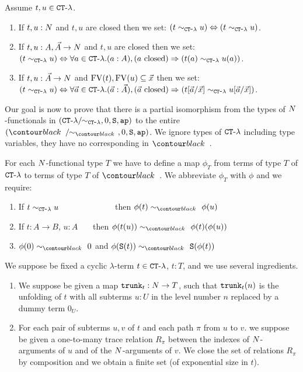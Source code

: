 \begin{definition}
Assume $t,u \in { {\tt CT} \mbox{-} \lambda}$.
\begin{enumerate}
\item
If $t,u:{N}$ and $t,u$ are closed then we set: 
$(t \sim_{{ {\tt CT} \mbox{-} \lambda}} u) \Leftrightarrow  (t \sim_{{ {\tt CT} \mbox{-} \lambda}} u)$.
\item
If $t,u:A,\vec{A}\rightarrow{N}$ and $t,u$ are closed then we set: 
$(t \sim_{{ {\tt CT} \mbox{-} \lambda}} u) \Leftrightarrow  
\forall a \in { {\tt CT} \mbox{-} \lambda}. (a:A), (\mbox{$a$ closed}) \Rightarrow (t(a) \sim_{{ {\tt CT} \mbox{-} \lambda}} u(a))$.
\item
If $t,u:\vec{A}\rightarrow{N}$ and ${{\rm FV}}(t), {{\rm FV}}(u) \subseteq \vec{x}$ then we set:
$(t \sim_{{ {\tt CT} \mbox{-} \lambda}} u) 
\Leftrightarrow  
\forall \vec{a} \in { {\tt CT} \mbox{-} \lambda}. 
(\vec{a}:\vec{A}), (\mbox{$\vec{a}$ closed})  \Rightarrow (t[\vec{a}/\vec{x}] \sim_{{ {\tt CT} \mbox{-} \lambda}} u[\vec{a}/\vec{x}])$.
\end{enumerate}
\end{definition}

Our goal is now to prove that there is a partial isomorphism from the types of ${N}$-functionals in 
$({ {\tt CT} \mbox{-} \lambda}/ \!\! \sim_{{ {\tt CT} \mbox{-} \lambda}}, 0, {\tt S}, {\tt ap})$ to the entire
$(\systemT/ \!\! \sim_{\systemT}, 0, \Succ, \ap)$.
We ignore types of ${ {\tt CT} \mbox{-} \lambda}$ including type variables, they have no corresponding in $\systemT$.

For each ${N}$-functional type $T$ we have to define a map $\phi_T$ from terms of type $T$ of ${ {\tt CT} \mbox{-} \lambda}$
to terms of type $T$ of $\systemT$. We abbreviate $\phi_T$ with $\phi$ and we require:

\begin{enumerate}
\item
If $t \sim_{{ {\tt CT} \mbox{-} \lambda}} u$ \ \ \ \ \ \ \ \ \ \ \ \ \ then $\phi(t) \sim_{\systemT} \phi(u)$

\item
If $t: A \rightarrow B$, $u:A$ \ \ \ then $\phi(t(u)) \sim_{\systemT} \phi(t)(\phi(u))$

\item
$\phi(0) \sim_{\systemT} 0$ and
$\phi(\Succ(t)) \sim_{\systemT} \Succ(\phi(t))$

\end{enumerate}

We suppose be fixed a cyclic $\lambda$-term $t \in { {\tt CT} \mbox{-} \lambda}$, $t : T$,
 and we use several ingredients. 


\begin{enumerate}
\item
We suppose be given a map ${\tt trunk}_t:{N} \rightarrow T$, such that ${\tt trunk}_t(n)$ is
the unfolding of $t$ with all subterms $u:U$ in the level number $n$ replaced by a dummy term $0_U$.
\item
For each pair of subterms $u,v$ of $t$ and each path $\pi$ from $u$ to $v$. 
we suppose be given a one-to-many trace
relation $R_\pi$ between the indexes of ${N}$-arguments of $u$ and of the ${N}$-arguments of $v$. 
We close the set of relations $R_\pi$ by composition 
and we obtain a finite set (of exponential size in $t$).
\end{enumerate}

